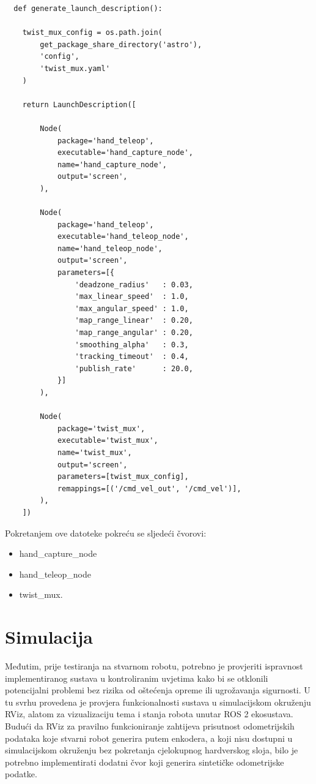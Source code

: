 \documentclass[12pt,a4paper,oneside]{report}
\begin{document}
\begin{verbatim}
  def generate_launch_description():

    twist_mux_config = os.path.join(
        get_package_share_directory('astro'),
        'config',
        'twist_mux.yaml'
    )

    return LaunchDescription([

        Node(
            package='hand_teleop',
            executable='hand_capture_node',
            name='hand_capture_node',
            output='screen',
        ),

        Node(
            package='hand_teleop',
            executable='hand_teleop_node',
            name='hand_teleop_node',
            output='screen',
            parameters=[{
                'deadzone_radius'   : 0.03,
                'max_linear_speed'  : 1.0,
                'max_angular_speed' : 1.0,
                'map_range_linear'  : 0.20,
                'map_range_angular' : 0.20,
                'smoothing_alpha'   : 0.3,
                'tracking_timeout'  : 0.4,
                'publish_rate'      : 20.0,
            }]
        ),

        Node(
            package='twist_mux',
            executable='twist_mux',
            name='twist_mux',
            output='screen',
            parameters=[twist_mux_config],
            remappings=[('/cmd_vel_out', '/cmd_vel')],
        ),
    ])
\end{verbatim}

Pokretanjem ove datoteke pokreću se sljedeći čvorovi:
\begin{itemize}
  \item hand\_capture\_node
  \item hand\_teleop\_node
  \item twist\_mux.
\end{itemize}


\section{Simulacija}
Međutim, prije testiranja na stvarnom robotu, potrebno je provjeriti ispravnost implementiranog sustava u 
kontroliranim uvjetima kako bi se otklonili potencijalni problemi bez rizika od oštećenja opreme ili 
ugrožavanja sigurnosti. U tu svrhu provedena je provjera funkcionalnosti sustava u simulacijskom okruženju 
RViz, alatom za vizualizaciju tema i stanja robota unutar ROS 2 ekosustava. Budući da RViz za pravilno 
funkcioniranje zahtijeva prisutnost odometrijskih podataka koje stvarni robot generira putem enkodera, a 
koji nisu dostupni u simulacijskom okruženju bez pokretanja cjelokupnog hardverskog sloja, bilo je potrebno 
implementirati dodatni čvor koji generira sintetičke odometrijske podatke. 
\end{document}
